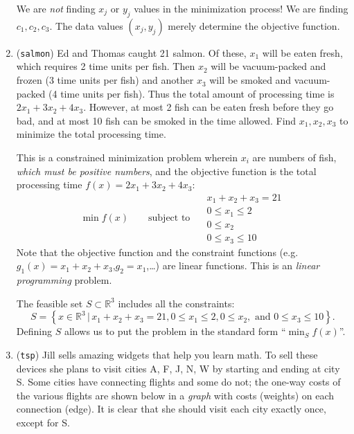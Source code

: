 \documentclass[11pt]{amsart}
\newcommand{\RR}{\mathbb{R}}
\begin{document}
\begin{enumerate}
We are \emph{not} finding $x_j$ or $y_j$ values in the minimization process!  We are finding $c_1,c_2,c_3$.  The data values $(x_j,y_j)$ merely determine the objective function.

\bigskip
\item (\texttt{salmon})  \quad Ed and Thomas caught 21 salmon.  Of these, $x_1$ will be eaten fresh, which requires 2 time units per fish.  Then $x_2$ will be vacuum-packed and frozen (3 time units per fish) and another $x_3$ will be smoked and vacuum-packed (4 time units per fish).  Thus the total amount of processing time is $2 x_1 + 3 x_2 + 4 x_3$.  However, at most 2 fish can be eaten fresh before they go bad, and at most 10 fish can be smoked in the time allowed.  Find $x_1,x_2,x_3$ to minimize the total processing time.

This is a constrained minimization problem wherein $x_i$ are numbers of fish, \emph{which must be positive numbers}, and the objective function is the total processing time $f(x) = 2 x_1 + 3 x_2 + 4 x_3$:
	$$\min f(x) \qquad \text{subject to }\quad \begin{matrix} x_1 + x_2 + x_3 = 21 \\ 0 \le x_1 \le 2 \\ 0 \le x_2 \\ 0 \le x_3 \le 10 \end{matrix}$$
Note that the objective function and the constraint functions (e.g.~$g_1(x)=x_1+x_2+x_3$,$g_2=x_1$,\dots) are linear functions.  This is an \emph{linear programming} problem.

The feasible set $S\subset \RR^3$ includes all the constraints:
    $$S = \left\{x \in \RR^3\,\big|\,x_1 + x_2 + x_3 = 21, 0 \le x_1 \le 2, 0 \le x_2, \text{ and } 0 \le x_3 \le 10\right\}.$$
Defining $S$ allows us to put the problem in the standard form ``$\min_S f(x)$''.

\bigskip
\item (\texttt{tsp})  \quad Jill sells amazing widgets that help you learn math.  To sell these devices she plans to visit cities A, F, J, N, W by starting and ending at city S.  Some cities have connecting flights and some do not; the one-way costs of the various flights are shown below in a \emph{graph} with costs (weights) on each connection (edge).  It is clear that she should visit each city exactly once, except for S.

\begin{center}
\vspace{-5mm}
\end{center}
\end{enumerate}
\end{document}
